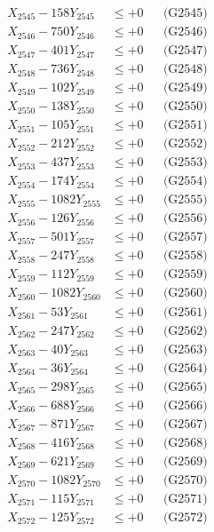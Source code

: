 \documentclass[a4paper,10pt]{article}
\begin{document}
{\begin{align}
X_{2545} - 158Y_{2545} &\leq +0 && \text{(G2545)} \\
X_{2546} - 750Y_{2546} &\leq +0 && \text{(G2546)} \\
X_{2547} - 401Y_{2547} &\leq +0 && \text{(G2547)} \\
X_{2548} - 736Y_{2548} &\leq +0 && \text{(G2548)} \\
X_{2549} - 102Y_{2549} &\leq +0 && \text{(G2549)} \\
X_{2550} - 138Y_{2550} &\leq +0 && \text{(G2550)} \\
\allowbreak
X_{2551} - 105Y_{2551} &\leq +0 && \text{(G2551)} \\
X_{2552} - 212Y_{2552} &\leq +0 && \text{(G2552)} \\
X_{2553} - 437Y_{2553} &\leq +0 && \text{(G2553)} \\
X_{2554} - 174Y_{2554} &\leq +0 && \text{(G2554)} \\
X_{2555} - 1082Y_{2555} &\leq +0 && \text{(G2555)} \\
X_{2556} - 126Y_{2556} &\leq +0 && \text{(G2556)} \\
X_{2557} - 501Y_{2557} &\leq +0 && \text{(G2557)} \\
X_{2558} - 247Y_{2558} &\leq +0 && \text{(G2558)} \\
X_{2559} - 112Y_{2559} &\leq +0 && \text{(G2559)} \\
X_{2560} - 1082Y_{2560} &\leq +0 && \text{(G2560)} \\
\allowbreak
X_{2561} - 53Y_{2561} &\leq +0 && \text{(G2561)} \\
X_{2562} - 247Y_{2562} &\leq +0 && \text{(G2562)} \\
X_{2563} - 40Y_{2563} &\leq +0 && \text{(G2563)} \\
X_{2564} - 36Y_{2564} &\leq +0 && \text{(G2564)} \\
X_{2565} - 298Y_{2565} &\leq +0 && \text{(G2565)} \\
X_{2566} - 688Y_{2566} &\leq +0 && \text{(G2566)} \\
X_{2567} - 871Y_{2567} &\leq +0 && \text{(G2567)} \\
X_{2568} - 416Y_{2568} &\leq +0 && \text{(G2568)} \\
X_{2569} - 621Y_{2569} &\leq +0 && \text{(G2569)} \\
X_{2570} - 1082Y_{2570} &\leq +0 && \text{(G2570)} \\
\allowbreak
X_{2571} - 115Y_{2571} &\leq +0 && \text{(G2571)} \\
X_{2572} - 125Y_{2572} &\leq +0 && \text{(G2572)} \\

\end{align}}
\end{document}
